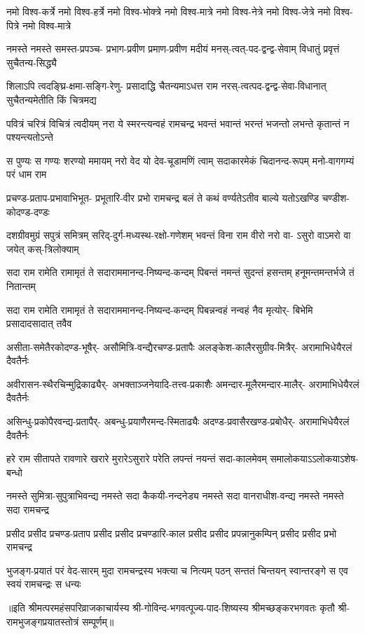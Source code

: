 \fourlineindentedshloka
{नमो विश्व-कर्त्रे नमो विश्व-हर्त्रे}
{नमो विश्व-भोक्त्रे नमो विश्व-मात्रे}
{नमो विश्व-नेत्रे नमो विश्व-जेत्रे}
{नमो विश्व-पित्रे नमो विश्व-मात्रे}%

\fourlineindentedshloka
{नमस्ते नमस्ते समस्त-प्रपञ्च-}
{प्रभाग-प्रवीण प्रमाण-प्रवीण}
{मदीयं मनस्-त्वत्-पद-द्वन्द्व-सेवाम्}
{विधातुं प्रवृत्तं सुचैतन्य-सिद्ध्यै}%

\fourlineindentedshloka
{शिलाऽपि त्वदङ्घ्रि-क्षमा-सङ्गि-रेणु-}
{प्रसादाद्धि चैतन्यमाऽधत्त राम}
{नरस्-त्वत्पद-द्वन्द्व-सेवा-विधानात्}
{सुचैतन्यमेतीति किं चित्रमद्य}%

\fourlineindentedshloka
{पवित्रं चरित्रं विचित्रं त्वदीयम्}
{नरा ये स्मरन्त्यन्वहं रामचन्द्र}
{भवन्तं भवान्तं भरन्तं भजन्तो}
{लभन्ते कृतान्तं न पश्यन्त्यतोऽन्ते}%

\fourlineindentedshloka
{स पुण्यः स गण्यः शरण्यो ममायम्}
{नरो वेद यो देव-चूडामणिं त्वाम्}
{सदाकारमेकं चिदानन्द-रूपम्}
{मनो-वागगम्यं परं धाम राम}%

\fourlineindentedshloka
{प्रचण्ड-प्रताप-प्रभावाभिभूत-}
{प्रभूतारि-वीर प्रभो रामचन्द्र}
{बलं ते कथं वर्ण्यतेऽतीव बाल्ये}
{यतोऽखण्डि चण्डीश-कोदण्ड-दण्डः}%

\fourlineindentedshloka
{दशग्रीवमुग्रं सपुत्रं समित्रम्}
{सरिद्-दुर्ग-मध्यस्थ-रक्षो-गणेशम्}
{भवन्तं विना राम वीरो नरो वा-}
{ऽसुरो वाऽमरो वा जयेत् कस्-त्रिलोक्याम्}%

\fourlineindentedshloka
{सदा राम रामेति रामामृतं ते}
{सदाराममानन्द-निष्यन्द-कन्दम्}
{पिबन्तं नमन्तं सुदन्तं हसन्तम्}
{हनूमन्तमन्तर्भजे तं नितान्तम्}%

\fourlineindentedshloka
{सदा राम रामेति रामामृतं ते}
{सदाराममानन्द-निष्यन्द-कन्दम्}
{पिबन्नन्वहं नन्वहं नैव मृत्योर्-}
{बिभेमि प्रसादादसादात् तवैव}%

\fourlineindentedshloka
{असीता-समेतैरकोदण्ड-भूषैर्-}
{असौमित्रि-वन्द्यैरचण्ड-प्रतापैः}
{अलङ्केश-कालैरसुग्रीव-मित्रैर्-}
{अरामाभिधेयैरलं दैवतैर्नः}%

\fourlineindentedshloka
{अवीरासन-स्थैरचिन्मुद्रिकाढ्यैर्-}
{अभक्ताञ्जनेयादि-तत्त्व-प्रकाशैः}
{अमन्दार-मूलैरमन्दार-मालैर्-}
{अरामाभिधेयैरलं दैवतैर्नः}%

\fourlineindentedshloka
{असिन्धु-प्रकोपैरवन्द्य-प्रतापैर्-}
{अबन्धु-प्रयाणैरमन्द-स्मिताढ्यैः}
{अदण्ड-प्रवासैरखण्ड-प्रबोधैर्-}
{अरामाभिधेयैरलं दैवतैर्नः}%

\fourlineindentedshloka
{हरे राम सीतापते रावणारे}
{खरारे मुरारेऽसुरारे परेति}
{लपन्तं नयन्तं सदा-कालमेवम्}
{समालोकयाऽऽलोकयाऽशेष-बन्धो}%

\fourlineindentedshloka
{नमस्ते सुमित्रा-सुपुत्राभिवन्द्य}
{नमस्ते सदा कैकयी-नन्दनेड्य}
{नमस्ते सदा वानराधीश-वन्द्य}
{नमस्ते नमस्ते सदा रामचन्द्र}%

\fourlineindentedshloka
{प्रसीद प्रसीद प्रचण्ड-प्रताप}
{प्रसीद प्रसीद प्रचण्डारि-काल}
{प्रसीद प्रसीद प्रपन्नानुकम्पिन्}
{प्रसीद प्रसीद प्रभो रामचन्द्र}%

\fourlineindentedshloka
{भुजङ्ग-प्रयातं परं वेद-सारम्}
{मुदा रामचन्द्रस्य भक्त्या च नित्यम्}
{पठन् सन्ततं चिन्तयन् स्वान्तरङ्गे}
{स एव स्वयं रामचन्द्रः स धन्यः}%

{॥इति श्रीमत्परमहंसपरिव्राजकाचार्यस्य श्री-गोविन्द-भगवत्पूज्य-पाद-शिष्यस्य
श्रीमच्छङ्करभगवतः कृतौ श्री-रामभुजङ्गप्रयातस्तोत्रं सम्पूर्णम्॥}

\closesection
